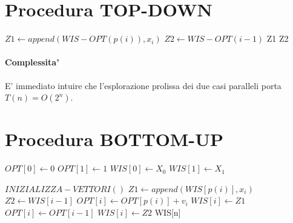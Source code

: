 \section{Procedura TOP-DOWN}

\begin{algorithm}
    \begin{algorithmic}
                \State {}
                \State {}
            \Else
                \State $Z1 \gets append(WIS-OPT(p(i)), x_i)$
                \State $Z2 \gets WIS-OPT(i - 1)$
                    \State \Return Z1
                \Else
                    \State \Return Z2
                \EndIf
            \EndIf
       \EndProcedure
    \end{algorithmic}
\end{algorithm}

\paragraph{Complessita'}
E' immediato intuire che l'esplorazione prolissa dei due casi paralleli porta $T(n) = O(2^n)$.

\newpage

\section{Procedura BOTTOM-UP}

\begin{algorithm}
    \begin{algorithmic}
            \State $OPT[0] \gets 0$
            \State $OPT[1] \gets 1$
            \State $WIS[0] \gets X_0$
            \State $WIS[1] \gets X_1$
        \EndProcedure
    \end{algorithmic}
\end{algorithm}

\begin{algorithm}
    \begin{algorithmic}
            \State $INIZIALIZZA-VETTORI()$
                \State $Z1 \gets append(WIS[p(i)], x_i)$
                \State $Z2 \gets WIS[i-1]$
                    \State $OPT[i] \gets OPT[p(i)] + v_i$
                    \State $WIS[i] \gets Z1$
                \Else
                    \State $OPT[i] \gets OPT[i-1]$
                    \State $WIS[i] \gets Z2$
                \EndIf
            \EndFor
            \State \Return WIS[n]
        \EndProcedure
    \end{algorithmic}
\end{algorithm}

